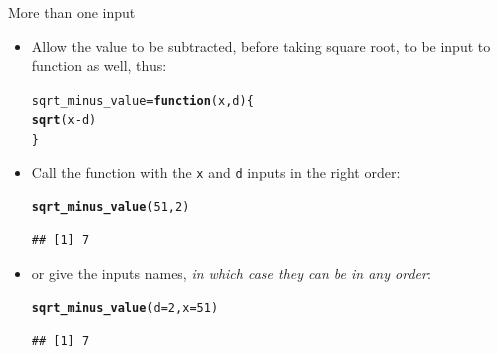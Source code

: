 \documentclass[unknownkeysallowed]{beamer}\usepackage[]{graphicx}\usepackage[]{color}
\makeatletter
\newcommand{\hlnum}[1]{\textcolor[rgb]{0.686,0.059,0.569}{#1}}%
\newcommand{\hlopt}[1]{\textcolor[rgb]{0,0,0}{#1}}%
\newcommand{\hlstd}[1]{\textcolor[rgb]{0.345,0.345,0.345}{#1}}%
\newcommand{\hlkwa}[1]{\textcolor[rgb]{0.161,0.373,0.58}{\textbf{#1}}}%
\newcommand{\hlkwb}[1]{\textcolor[rgb]{0.69,0.353,0.396}{#1}}%
\newcommand{\hlkwc}[1]{\textcolor[rgb]{0.333,0.667,0.333}{#1}}%
\newcommand{\hlkwd}[1]{\textcolor[rgb]{0.737,0.353,0.396}{\textbf{#1}}}%
\newenvironment{kframe}{%
 \def\at@end@of@kframe{}%
 \ifinner\ifhmode%
  \def\at@end@of@kframe{\end{minipage}}%
  \begin{minipage}{\columnwidth}%
 \fi\fi%
 \def\FrameCommand##1{\hskip\@totalleftmargin \hskip-\fboxsep
 \colorbox{shadecolor}{##1}\hskip-\fboxsep
     \hskip-\linewidth \hskip-\@totalleftmargin \hskip\columnwidth}%
 \MakeFramed {\advance\hsize-\width
   \@totalleftmargin\z@ \linewidth\hsize
   \@setminipage}}%
 {\par\unskip\endMakeFramed%
 \at@end@of@kframe}
\newenvironment{knitrout}{}{} %
\makeatother
\begin{document}
\begin{frame}[fragile]{More than one input}
  
  \begin{itemize}
  \item Allow the value to be subtracted, before taking square root,
    to be input to function as well, thus:
    
\begin{knitrout}
\color{fgcolor}\begin{kframe}
\begin{alltt}
\hlstd{sqrt_minus_value}\hlkwb{=}\hlkwa{function}\hlstd{(}\hlkwc{x}\hlstd{,}\hlkwc{d}\hlstd{) \{}
  \hlkwd{sqrt}\hlstd{(x}\hlopt{-}\hlstd{d)}
\hlstd{\}}
\end{alltt}
\end{kframe}
\end{knitrout}
\item Call the function with the \texttt{x} and \texttt{d} inputs in
  the right order:
  
\begin{knitrout}
\color{fgcolor}\begin{kframe}
\begin{alltt}
\hlkwd{sqrt_minus_value}\hlstd{(}\hlnum{51}\hlstd{,}\hlnum{2}\hlstd{)}
\end{alltt}
\begin{verbatim}
## [1] 7
\end{verbatim}
\end{kframe}
\end{knitrout}

\item or give the inputs names, \emph{in which case they can be in any
  order}:

\begin{knitrout}
\color{fgcolor}\begin{kframe}
\begin{alltt}
\hlkwd{sqrt_minus_value}\hlstd{(}\hlkwc{d}\hlstd{=}\hlnum{2}\hlstd{,}\hlkwc{x}\hlstd{=}\hlnum{51}\hlstd{)}
\end{alltt}
\begin{verbatim}
## [1] 7
\end{verbatim}
\end{kframe}
\end{knitrout}
  \end{itemize}
  
\end{frame}
\end{document}
